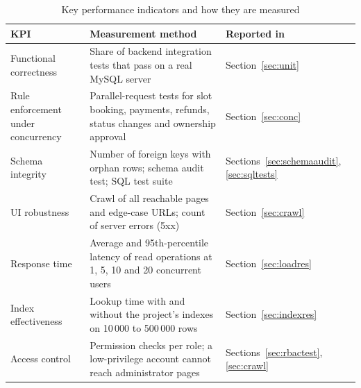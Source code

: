 \begin{table}[H]
\centering\small
\caption{Key performance indicators and how they are measured}\label{tab:kpi}
\begin{tabularx}{\linewidth}{@{}p{3.1cm}Xp{3.3cm}@{}}
\toprule
\textbf{KPI} & \textbf{Measurement method} & \textbf{Reported in}\\ \midrule
Functional correctness & Share of backend integration tests that pass on a real MySQL server & Section~\ref{sec:unit}\\
Rule enforcement under concurrency & Parallel-request tests for slot booking, payments, refunds, status changes and ownership approval & Section~\ref{sec:conc}\\
Schema integrity & Number of foreign keys with orphan rows; schema audit test; SQL test suite & Sections~\ref{sec:schemaaudit}, \ref{sec:sqltests}\\
UI robustness & Crawl of all reachable pages and edge-case URLs; count of server errors (5xx) & Section~\ref{sec:crawl}\\
Response time & Average and 95th-percentile latency of read operations at 1, 5, 10 and 20 concurrent users & Section~\ref{sec:loadres}\\
Index effectiveness & Lookup time with and without the project's indexes on 10\,000 to 500\,000 rows & Section~\ref{sec:indexres}\\
Access control & Permission checks per role; a low-privilege account cannot reach administrator pages & Sections~\ref{sec:rbactest}, \ref{sec:crawl}\\
\bottomrule
\end{tabularx}
\end{table}
